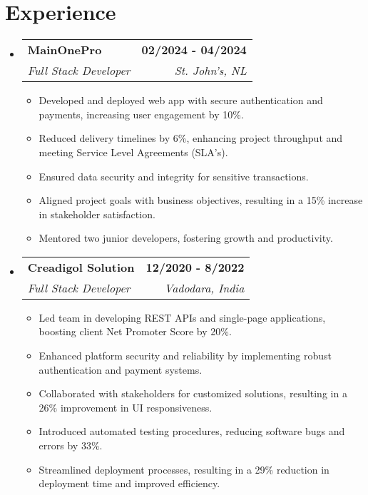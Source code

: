 \documentclass[letterpaper,11pt]{article}
\makeatletter
\newcommand{\resumeItem}[1]{
  \item\small{
    {#1 \vspace{-2pt}}
  }
}
\newcommand{\resumeSubheading}[4]{
  \vspace{-2pt}\item
    \begin{tabular*}{1.0\textwidth}[t]{l@{\extracolsep{\fill}}r}
      \textbf{#1} & \textbf{\small #2} \\
      \textit{\small#3} & \textit{\small #4} \\
    \end{tabular*}\vspace{-7pt}
}
\newcommand{\resumeSubHeadingListStart}{\begin{itemize}[leftmargin=0.0in, label={}]}
\newcommand{\resumeSubHeadingListEnd}{\end{itemize}}
\newcommand{\resumeItemListStart}{\begin{itemize}}
\newcommand{\resumeItemListEnd}{\end{itemize}\vspace{-5pt}}
\makeatother
\begin{document}
\section{Experience}
  \resumeSubHeadingListStart
    \resumeSubheading
      {MainOnePro}{02/2024 - 04/2024}
      {Full Stack Developer}{St. John's, NL}
      \resumeItemListStart
        \resumeItem{Developed and deployed web app with secure authentication and payments, increasing user engagement by 10\%.}
        \resumeItem{Reduced delivery timelines by 6\%, enhancing project throughput and meeting Service Level Agreements (SLA’s).}
        \resumeItem{Ensured data security and integrity for sensitive transactions.}
        \resumeItem{Aligned project goals with business objectives, resulting in a 15\% increase in stakeholder satisfaction.}
        \resumeItem{Mentored two junior developers, fostering growth and productivity.}
      \resumeItemListEnd
    \resumeSubheading
      {Creadigol Solution}{12/2020 - 8/2022}
      {Full Stack Developer}{Vadodara, India}
      \resumeItemListStart
        \resumeItem{Led team in developing REST APIs and single-page applications, boosting client Net Promoter Score by 20\%.}
        \resumeItem{Enhanced platform security and reliability by implementing robust authentication and payment systems.}
        \resumeItem{Collaborated with stakeholders for customized solutions, resulting in a 26\% improvement in UI responsiveness.}
        \resumeItem{Introduced automated testing procedures, reducing software bugs and errors by 33\%.}
        \resumeItem{Streamlined deployment processes, resulting in a 29\% reduction in deployment time and improved efficiency.}
      \resumeItemListEnd
  \resumeSubHeadingListEnd
\vspace{-16pt}
\end{document}
